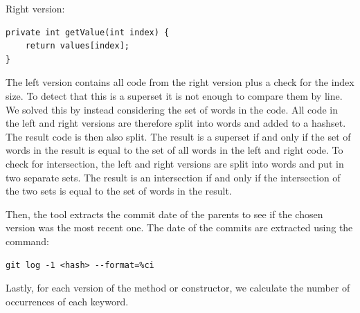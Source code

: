 Right version:
\lstset{language=Java,numbers=left,xleftmargin=2em,frame=single,framexleftmargin=1.5em}
\begin{lstlisting}[frame=single]
private int getValue(int index) {
	return values[index];
}
\end{lstlisting}

The left version contains all code from the right version plus a check for the index size. To detect that this is a superset it is not enough to compare them by line. We solved this by instead considering the set of words in the code. All code in the left and right versions are therefore split into words and added to a hashset. The result code is then also split. The result is a superset if and only if the set of words in the result is equal to the set of all words in the left and right code. To check for intersection, the left and right versions are split into words and put in two separate sets. The result is an intersection if and only if the intersection of the two sets is equal to the set of words in the result.

Then, the tool extracts the commit date of the parents to see if the chosen version was the most recent one. The date of the commits are extracted using the command:
\lstset{language=Bash,numbers=left,xleftmargin=2em,frame=single,framexleftmargin=1.5em}
\begin{lstlisting}[frame=single]
git log -1 <hash> --format=%ci
\end{lstlisting}

Lastly, for each version of the method or constructor, we calculate the number of occurrences of each keyword.




